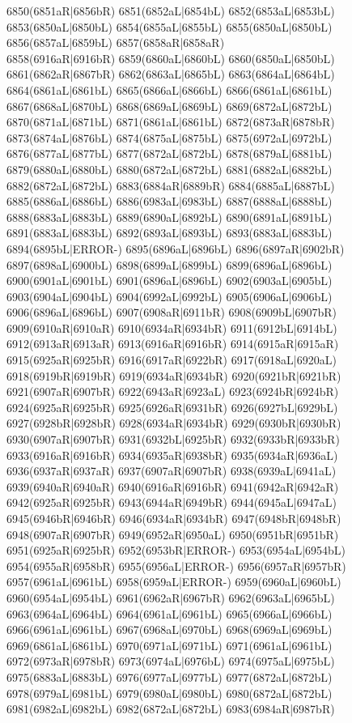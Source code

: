 6850(6851aR|6856bR) 6851(6852aL|6854bL) 6852(6853aL|6853bL) 6853(6850aL|6850bL) 6854(6855aL|6855bL) 6855(6850aL|6850bL) 6856(6857aL|6859bL) 6857(6858aR|6858aR) \\6858(6916aR|6916bR) 6859(6860aL|6860bL) 6860(6850aL|6850bL) 6861(6862aR|6867bR) 6862(6863aL|6865bL) 6863(6864aL|6864bL) 6864(6861aL|6861bL) 6865(6866aL|6866bL) 6866(6861aL|6861bL) \\6867(6868aL|6870bL) 6868(6869aL|6869bL) 6869(6872aL|6872bL) 6870(6871aL|6871bL) 6871(6861aL|6861bL) 6872(6873aR|6878bR) 6873(6874aL|6876bL) 6874(6875aL|6875bL) 6875(6972aL|6972bL) \\6876(6877aL|6877bL) 6877(6872aL|6872bL) 6878(6879aL|6881bL) 6879(6880aL|6880bL) 6880(6872aL|6872bL) 6881(6882aL|6882bL) 6882(6872aL|6872bL) 6883(6884aR|6889bR) 6884(6885aL|6887bL) \\6885(6886aL|6886bL) 6886(6983aL|6983bL) 6887(6888aL|6888bL) 6888(6883aL|6883bL) 6889(6890aL|6892bL) 6890(6891aL|6891bL) 6891(6883aL|6883bL) 6892(6893aL|6893bL) 6893(6883aL|6883bL) \\6894(6895bL|ERROR-) 6895(6896aL|6896bL) 6896(6897aR|6902bR) 6897(6898aL|6900bL) 6898(6899aL|6899bL) 6899(6896aL|6896bL) 6900(6901aL|6901bL) 6901(6896aL|6896bL) 6902(6903aL|6905bL) \\6903(6904aL|6904bL) 6904(6992aL|6992bL) 6905(6906aL|6906bL) 6906(6896aL|6896bL) 6907(6908aR|6911bR) 6908(6909bL|6907bR) 6909(6910aR|6910aR) 6910(6934aR|6934bR) 6911(6912bL|6914bL) \\6912(6913aR|6913aR) 6913(6916aR|6916bR) 6914(6915aR|6915aR) 6915(6925aR|6925bR) 6916(6917aR|6922bR) 6917(6918aL|6920aL) 6918(6919bR|6919bR) 6919(6934aR|6934bR) 6920(6921bR|6921bR) \\6921(6907aR|6907bR) 6922(6943aR|6923aL) 6923(6924bR|6924bR) 6924(6925aR|6925bR) 6925(6926aR|6931bR) 6926(6927bL|6929bL) 6927(6928bR|6928bR) 6928(6934aR|6934bR) 6929(6930bR|6930bR) \\6930(6907aR|6907bR) 6931(6932bL|6925bR) 6932(6933bR|6933bR) 6933(6916aR|6916bR) 6934(6935aR|6938bR) 6935(6934aR|6936aL) 6936(6937aR|6937aR) 6937(6907aR|6907bR) 6938(6939aL|6941aL) \\6939(6940aR|6940aR) 6940(6916aR|6916bR) 6941(6942aR|6942aR) 6942(6925aR|6925bR) 6943(6944aR|6949bR) 6944(6945aL|6947aL) 6945(6946bR|6946bR) 6946(6934aR|6934bR) 6947(6948bR|6948bR) \\6948(6907aR|6907bR) 6949(6952aR|6950aL) 6950(6951bR|6951bR) 6951(6925aR|6925bR) 6952(6953bR|ERROR-) 6953(6954aL|6954bL) 6954(6955aR|6958bR) 6955(6956aL|ERROR-) 6956(6957aR|6957bR) \\6957(6961aL|6961bL) 6958(6959aL|ERROR-) 6959(6960aL|6960bL) 6960(6954aL|6954bL) 6961(6962aR|6967bR) 6962(6963aL|6965bL) 6963(6964aL|6964bL) 6964(6961aL|6961bL) 6965(6966aL|6966bL) \\6966(6961aL|6961bL) 6967(6968aL|6970bL) 6968(6969aL|6969bL) 6969(6861aL|6861bL) 6970(6971aL|6971bL) 6971(6961aL|6961bL) 6972(6973aR|6978bR) 6973(6974aL|6976bL) 6974(6975aL|6975bL) \\6975(6883aL|6883bL) 6976(6977aL|6977bL) 6977(6872aL|6872bL) 6978(6979aL|6981bL) 6979(6980aL|6980bL) 6980(6872aL|6872bL) 6981(6982aL|6982bL) 6982(6872aL|6872bL) 6983(6984aR|6987bR) 